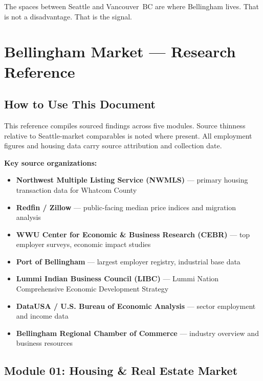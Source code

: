 \documentclass[11pt,letterpaper]{article}
\newcommand{\stageheader}[2]{%
  \noindent\colorbox{#2}{\makebox[\textwidth][l]{%
    \textcolor{white}{\bfseries\sffamily\hspace{6pt}#1\hspace{6pt}}}}%
  \vspace{0.5em}\par%
}
\begin{document}
The spaces between Seattle and Vancouver~BC are where Bellingham lives. That is not a disadvantage. That is the signal.

\newpage
\stageheader{STAGE 2 --- RESEARCH REFERENCE}{secondary}

\section{Bellingham Market --- Research Reference}

\subsection{How to Use This Document}

This reference compiles sourced findings across five modules. Source thinness relative to Seattle-market comparables is noted where present. All employment figures and housing data carry source attribution and collection date.

\textbf{Key source organizations:}
\begin{itemize}[leftmargin=*]
  \item \textbf{Northwest Multiple Listing Service (NWMLS)} --- primary housing transaction data for Whatcom County
  \item \textbf{Redfin / Zillow} --- public-facing median price indices and migration analysis
  \item \textbf{WWU Center for Economic \& Business Research (CEBR)} --- top employer surveys, economic impact studies
  \item \textbf{Port of Bellingham} --- largest employer registry, industrial base data
  \item \textbf{Lummi Indian Business Council (LIBC)} --- Lummi Nation Comprehensive Economic Development Strategy
  \item \textbf{DataUSA / U.S. Bureau of Economic Analysis} --- sector employment and income data
  \item \textbf{Bellingham Regional Chamber of Commerce} --- industry overview and business resources
\end{itemize}

\subsection{Module 01: Housing \& Real Estate Market}
\end{document}
